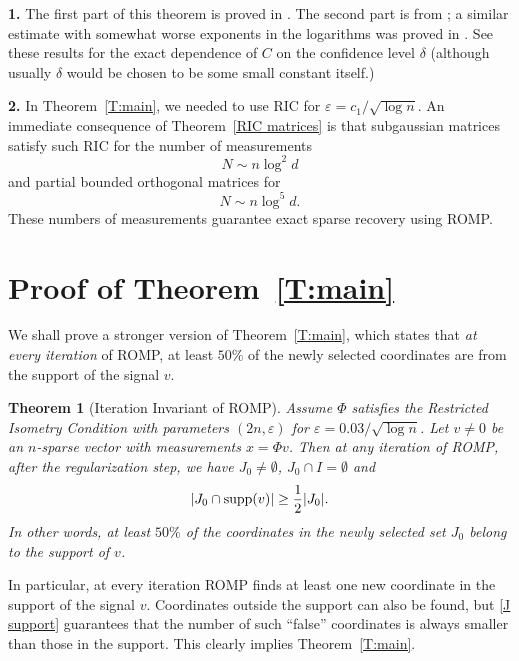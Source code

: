 \documentclass[12pt]{amsart}
\theoremstyle{plain}
\newtheorem{theorem}{Theorem}[section]
\theoremstyle{definition}
\theoremstyle{remark}
\numberwithin{equation}{section}
\begin{document}
\begin{remarks}
  {\bf 1. } The first part of this theorem is proved in \cite{MPT}.
    The second part is from \cite{RV}; a similar estimate with somewhat worse exponents
    in the logarithms was proved in \cite{CT}. See these results for the exact
    dependence of $C$ on the confidence level ${\delta}$ (although usually ${\delta}$ would be chosen
    to be some small constant itself.) 
    
  {\bf 2. } In Theorem~\ref{T:main}, we needed to use RIC for ${\varepsilon} = c_1 / \sqrt{\log n}$. 
    An immediate consequence of Theorem~\ref{RIC matrices} is that 
    subgaussian matrices satisfy such RIC for the number of measurements
    $$
    N \sim n \log^2 d
    $$
    and partial bounded orthogonal matrices for
    $$
    N \sim n \log^5 d.
    $$
    These numbers of measurements guarantee exact sparse recovery using ROMP.
\end{remarks}

\section{Proof of Theorem~\ref{T:main}}
\label{s: proof}

We shall prove a stronger version of Theorem~\ref{T:main}, which states that 
{\em at every iteration} of ROMP, at least $50\%$ of the newly selected coordinates
are from the support of the signal $v$. 

\begin{theorem}[Iteration Invariant of ROMP] \label{T:it}
  Assume $\Phi$ satisfies the Restricted Isometry Condition 
  with parameters $(2n, {\varepsilon})$ for ${\varepsilon} = 0.03 / \sqrt{\log n}$. 
  Let $v \ne 0$ be an $n$-sparse vector with measurements $x = \Phi v$. 
  Then at any iteration of ROMP, after the regularization step, we have
  $J_0 \ne \emptyset$, $J_0 \cap I = \emptyset$ and 
  \begin{equation}                  \label{J support}
    |J_0 \cap {{\rm supp}}(v)| \geq \frac{1}{2}|J_0|.
  \end{equation}
  In other words, at least $50\%$ of the coordinates in the newly selected set $J_0$ 
  belong to the support of $v$.
\end{theorem}

In particular, at every iteration ROMP finds at least one new coordinate 
in the support of the signal $v$. Coordinates outside the support can also be found, 
but \eqref{J support} guarantees that the number of such ``false'' coordinates 
is always smaller than those in the support. 
This clearly implies Theorem~\ref{T:main}.
\end{document}
